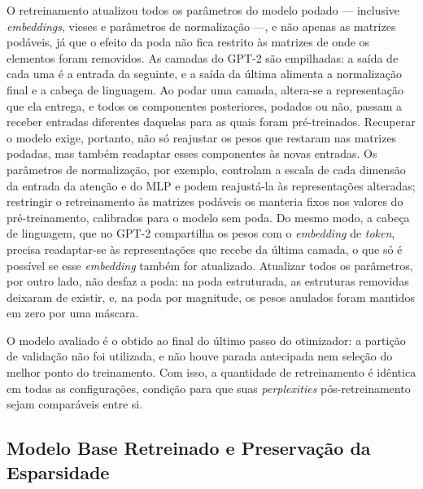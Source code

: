 O retreinamento atualizou todos os parâmetros do modelo podado --- inclusive
\textit{embeddings}, vieses e parâmetros de normalização ---, e não apenas as matrizes
podáveis, já que o efeito da poda não fica
restrito às matrizes de onde os elementos foram removidos. As camadas do GPT-2 são
empilhadas: a saída de cada uma é a entrada da
seguinte, e a saída da última alimenta a normalização final e a cabeça de linguagem. Ao
podar uma camada, altera-se a representação que ela entrega, e todos os componentes
posteriores, podados ou não, passam a receber entradas diferentes daquelas para as quais
foram pré-treinados. Recuperar o modelo exige, portanto, não só reajustar os pesos que
restaram nas matrizes podadas, mas também readaptar esses componentes às novas entradas.
Os parâmetros de normalização, por exemplo, controlam a escala de cada dimensão da entrada
da atenção e do MLP e podem reajustá-la às representações alteradas; restringir o
retreinamento às matrizes podáveis os manteria fixos nos valores do pré-treinamento,
calibrados para o modelo sem poda. Do mesmo modo, a cabeça de linguagem, que no GPT-2
compartilha os pesos com o \textit{embedding} de \textit{token}, precisa readaptar-se às
representações que recebe da última camada, o que só é possível se esse
\textit{embedding} também for atualizado. Atualizar todos os parâmetros, por outro lado, não desfaz a poda: na poda
estruturada, as estruturas removidas deixaram de existir, e, na poda por magnitude, os
pesos anulados foram mantidos em zero por uma máscara.

O modelo avaliado é o obtido ao final
do último passo do otimizador: a partição de validação não foi utilizada, e não houve
parada antecipada nem seleção do melhor ponto do treinamento. Com isso, a quantidade de
retreinamento é idêntica em todas as configurações, condição para que suas
\textit{perplexities} pós-retreinamento sejam comparáveis entre si.

\subsection{Modelo Base Retreinado e Preservação da Esparsidade}\label{subsec:ft_validade}

